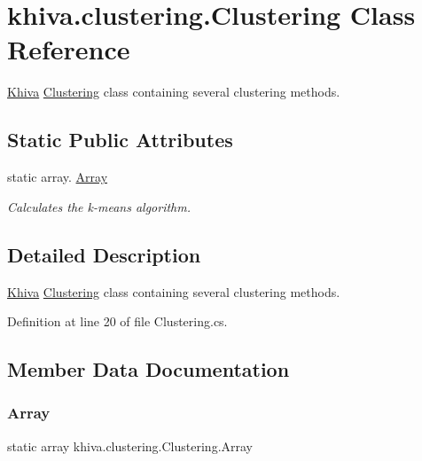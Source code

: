 \hypertarget{classkhiva_1_1clustering_1_1_clustering}{}\section{khiva.\+clustering.\+Clustering Class Reference}
\label{classkhiva_1_1clustering_1_1_clustering}


\mbox{\hyperlink{classkhiva_1_1_khiva}{Khiva}} \mbox{\hyperlink{classkhiva_1_1clustering_1_1_clustering}{Clustering}} class containing several clustering methods.  


\subsection*{Static Public Attributes}
\begin{DoxyCompactItemize}
\item 
static array. \mbox{\hyperlink{classkhiva_1_1clustering_1_1_clustering_a3e647c9d8f3b4e9dbe3d94774270c47e}{Array}}
\begin{DoxyCompactList}\small\item\em Calculates the k-\/means algorithm. \end{DoxyCompactList}\end{DoxyCompactItemize}


\subsection{Detailed Description}
\mbox{\hyperlink{classkhiva_1_1_khiva}{Khiva}} \mbox{\hyperlink{classkhiva_1_1clustering_1_1_clustering}{Clustering}} class containing several clustering methods. 



Definition at line 20 of file Clustering.\+cs.



\subsection{Member Data Documentation}
\mbox{\label{classkhiva_1_1clustering_1_1_clustering_a3e647c9d8f3b4e9dbe3d94774270c47e}} 
\subsubsection{\texorpdfstring{Array}{Array}}
{\footnotesize\ttfamily static array khiva.\+clustering.\+Clustering.\+Array\hspace{0.3cm}{\ttfamily [static]}}



